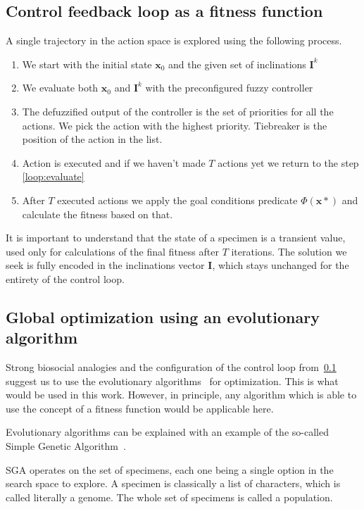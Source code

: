 \documentclass[11pt, a4paper]{article}
\begin{document}
	\subsection{Control feedback loop as a fitness function}\label{fitness}

	A single trajectory in the action space is explored using the following process.
	
	\begin{enumerate}
		\item We start with the initial state $\mathbf{x}_0$ and the given set of inclinations $\mathbf{I}^k$
		\item\label{loop:evaluate} We evaluate both $\mathbf{x}_0$ and $\mathbf{I}^k$ with the preconfigured fuzzy controller
		\item The defuzzified output of the controller is the set of priorities for all the  actions. We pick the action with the highest priority. Tiebreaker is the position of the action in the list.
		\item Action is executed and if we haven't made $T$ actions yet we return to the step \ref{loop:evaluate}
		\item After $T$ executed actions we apply the goal conditions predicate $\Phi(\mathbf{x}*)$ and calculate the fitness based on that.
	\end{enumerate}

  It is important to understand that the state of a specimen is a transient value, used only for calculations of the final fitness after $T$ iterations.
  The solution we seek is fully encoded in the inclinations vector $\mathbf{I}$, which stays unchanged for the entirety of the control loop.

	\subsection{Global optimization using an evolutionary algorithm}

	Strong biosocial analogies and the configuration of the control loop from~\ref{fitness} suggest us to use the evolutionary algorithms~\cite{evolutionary} for optimization.
	This is what would be used in this work.
	However, in principle, any algorithm which is able to use the concept of a fitness function would be applicable here.

  Evolutionary algorithms can be explained with an example of the so-called Simple Genetic Algorithm~\cite{pagmo:sga}.

  SGA operates on the set of specimens, each one being a single option in the search space to explore.
  A specimen is classically a list of characters, which is called literally a genome.
  The whole set of specimens is called a population.
\end{document}
